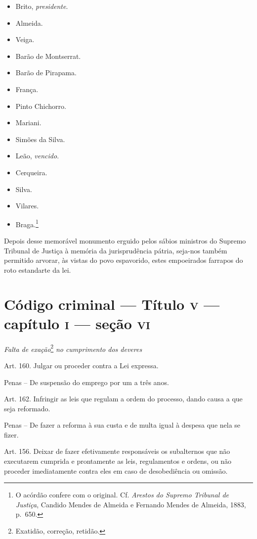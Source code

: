 \begin{itemize}
\tightlist
\item
  Brito, \emph{presidente}.
\item
  Almeida.
\item
  Veiga.
\item
  Barão de Montserrat.
\item
  Barão de Pirapama.
\item
  França.
\item
  Pinto Chichorro.
\item
  Mariani.
\item
  Simões da Silva.
\item
  Leão, \emph{vencido}.
\item
  Cerqueira.
\item
  Silva.
\item
  Vilares.
\item
  Braga.\footnote{O acórdão confere com o original. Cf. \emph{Arestos
    do Supremo Tribunal de Justiça}, Candido Mendes de Almeida e
    Fernando Mendes de Almeida, 1883, p.~650.}
\end{itemize}

Depois desse memorável monumento erguido pelos sábios ministros do
Supremo Tribunal de Justiça à memória da jurisprudência pátria, seja-nos
também permitido arvorar, às vistas do povo espavorido, estes
empoeirados farrapos do roto estandarte da lei.

\section{Código criminal --- Título \textsc{v} --- capítulo \textsc{i} --- seção \textsc{vi}}

\emph{Falta de exação}\footnote{Exatidão, correção, retidão.} \emph{no
cumprimento dos deveres}

Art. 160. Julgar ou proceder contra a Lei expressa.

Penas -- De suspensão do emprego por um a três anos.

Art. 162. Infringir as leis que regulam a ordem do processo, dando causa
a que seja reformado.

Penas -- De fazer a reforma à sua custa e de multa igual à despesa que
nela se fizer.

Art. 156. Deixar de fazer efetivamente responsáveis os subalternos que
não executarem cumprida e prontamente as leis, regulamentos e ordens, ou
não proceder imediatamente contra eles em caso de desobediência ou
omissão.

